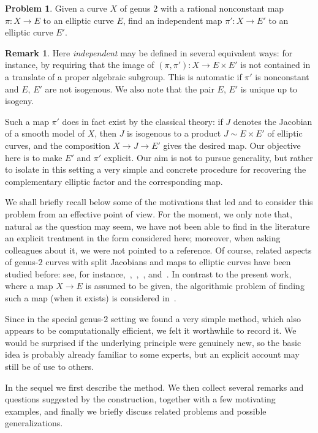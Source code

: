 \documentclass[a4paper,twoside,english]{amsart}
\theoremstyle{plain}
\theoremstyle{definition}
\newtheorem{remark}[theorem]{Remark}
\newtheorem{problem}[theorem]{Problem}
\begin{document}
\begin{problem}\label{prob}
Given a curve $X$ of genus $2$ with a rational nonconstant map $\pi:X\to E$ to an elliptic curve $E$, find an independent map $\pi':X\to E'$ to an elliptic curve $E'$.    
\end{problem}

\begin{remark}
Here \emph{independent} may be defined in several equivalent ways: for instance, by requiring that the image of $(\pi,\pi'):X\to E\times E'$ is not contained in a translate of a proper algebraic subgroup. This is automatic if $\pi'$ is nonconstant and $E,\, E'$ are not isogenous. We also note that the pair $E,\, E'$ is unique up to isogeny.
\end{remark}

Such a map $\pi'$ does in fact exist by the classical theory: if $J$ denotes the Jacobian of a smooth model of $X$, then $J$ is isogenous to a product $J \sim E\times E'$ of elliptic curves, and the composition $X \to J \to E'$ gives the desired map. Our objective here is to make $E'$ and $\pi'$ explicit.
Our aim is not to pursue generality, but rather to isolate in this setting a very simple and concrete procedure for recovering the complementary elliptic factor and the corresponding map. 


We shall briefly recall below some of the motivations that led {} and {} to consider this problem from an effective point of view. For the moment, we only note that, natural as the question may seem, we have not been able to find in the literature an explicit treatment in the form considered here; moreover, when asking colleagues about it, we were not pointed to a reference. Of course, related aspects of genus-$2$ curves with split Jacobians and maps to elliptic curves have been studied before: see, for instance,~\cite{Kuhn},~\cite{freyCurvesGenus21991},~\cite{Shaska}, and~\cite{MR3427148}. In contrast to the present work, where a map $X\to E$ is assumed to be given, the algorithmic problem of finding such a map (when it exists) is considered in~\cite{Lombardo}.

Since in the special genus-$2$ setting we found a very simple method, which also appears to be computationally efficient, we felt it worthwhile to record it. 
We would be surprised if the underlying principle were genuinely new, so the basic idea is probably already familiar to some experts, but an explicit account may still be of use to others.

In the sequel we first describe the method. We then collect several remarks and questions suggested by the construction, together with a few motivating examples, and finally we briefly discuss related problems and possible generalizations.
\end{document}
